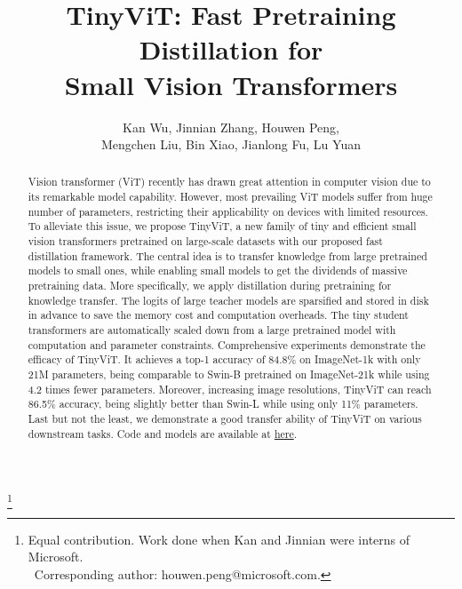 \documentclass[runningheads]{llncs}
\newcommand\blfootnote[1]{\begingroup
  \renewcommand\thefootnote{}\footnote{#1}\addtocounter{footnote}{-1}\endgroup
}
\begin{document}
\pagestyle{headings}
\mainmatter
\def\ECCVSubNumber{4537}  

\title{TinyViT: Fast Pretraining Distillation for \\  Small Vision Transformers}

\author{Kan Wu, Jinnian Zhang, Houwen Peng,  \\ Mengchen Liu,
Bin Xiao, Jianlong Fu, Lu Yuan\\
}




\maketitle

\blfootnote{
  Equal contribution. Work done when Kan and Jinnian were interns of Microsoft.
  \\
  ~Corresponding author: houwen.peng@microsoft.com.
}


\begin{abstract}
Vision transformer (ViT) recently has drawn great attention in computer vision due to its remarkable model capability. However, most prevailing ViT models suffer from huge number of parameters, restricting their applicability on devices with limited resources. To alleviate this issue, we propose TinyViT, a new family of tiny and efficient small vision transformers pretrained on large-scale datasets with our proposed fast distillation framework.
The central idea is to transfer knowledge from large pretrained models to small ones, while enabling small models to get the dividends of massive pretraining data. More specifically, we apply distillation during pretraining  for knowledge transfer. The logits of large teacher models are sparsified and stored in disk in advance to save the memory cost and computation overheads. The tiny student transformers are automatically scaled down from a large pretrained model with 
computation and parameter constraints.
Comprehensive experiments demonstrate the efficacy of TinyViT. It achieves a top-1 accuracy of 84.8\% on ImageNet-1k with only 21M parameters, being comparable to Swin-B pretrained on ImageNet-21k while using 4.2 times fewer parameters.
Moreover, increasing image resolutions, TinyViT can reach 86.5\% accuracy, being slightly better than Swin-L while using only 11\% parameters. 
Last but not the least, we demonstrate a good transfer ability of TinyViT on various downstream tasks. Code and models are available at \href{https://github.com/microsoft/Cream/tree/main/TinyViT}{here}.

\end{abstract}
\end{document}
